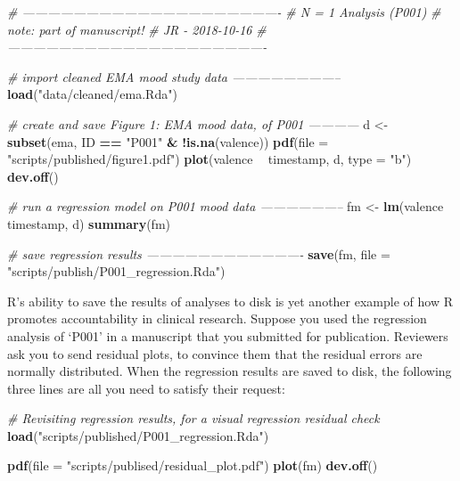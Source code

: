\documentclass[]{book}
\newenvironment{Shaded}{\begin{snugshade}}{\end{snugshade}}
\newcommand{\KeywordTok}[1]{\textcolor[rgb]{0.13,0.29,0.53}{\textbf{#1}}}
\newcommand{\DataTypeTok}[1]{\textcolor[rgb]{0.13,0.29,0.53}{#1}}
\newcommand{\StringTok}[1]{\textcolor[rgb]{0.31,0.60,0.02}{#1}}
\newcommand{\CommentTok}[1]{\textcolor[rgb]{0.56,0.35,0.01}{\textit{#1}}}
\newcommand{\OperatorTok}[1]{\textcolor[rgb]{0.81,0.36,0.00}{\textbf{#1}}}
\newcommand{\NormalTok}[1]{#1}
\begin{document}
\begin{Shaded}
\begin{Highlighting}[]
\CommentTok{# -------------------------------------------------------------}
\CommentTok{# N = 1 Analysis (P001)}
\CommentTok{# note: part of manuscript!}
\CommentTok{# JR - 2018-10-16}
\CommentTok{# -------------------------------------------------------------}

\CommentTok{# import cleaned EMA mood study data --------------------------}
\KeywordTok{load}\NormalTok{(}\StringTok{"data/cleaned/ema.Rda"}\NormalTok{)}

\CommentTok{# create and save Figure 1: EMA mood data, of P001 ------------ }
\NormalTok{d <-}\StringTok{ }\KeywordTok{subset}\NormalTok{(ema, ID }\OperatorTok{==}\StringTok{ "P001"} \OperatorTok{&}\StringTok{ }\OperatorTok{!}\KeywordTok{is.na}\NormalTok{(valence))}
\KeywordTok{pdf}\NormalTok{(}\DataTypeTok{file =} \StringTok{"scripts/published/figure1.pdf"}\NormalTok{)}
\KeywordTok{plot}\NormalTok{(valence }\OperatorTok{~}\StringTok{ }\NormalTok{timestamp, d, }\DataTypeTok{type =} \StringTok{"b"}\NormalTok{)}
\KeywordTok{dev.off}\NormalTok{()}

\CommentTok{# run a regression model on P001 mood data --------------------}
\NormalTok{fm <-}\StringTok{ }\KeywordTok{lm}\NormalTok{(valence }\OperatorTok{~}\StringTok{ }\NormalTok{timestamp, d)}
\KeywordTok{summary}\NormalTok{(fm)}

\CommentTok{# save regression results -------------------------------------}
\KeywordTok{save}\NormalTok{(fm, }\DataTypeTok{file =} \StringTok{"scripts/publish/P001_regression.Rda"}\NormalTok{)}
\end{Highlighting}
\end{Shaded}

R's ability to save the results of analyses to disk is yet another
example of how R promotes accountability in clinical research. Suppose
you used the regression analysis of `P001' in a manuscript that you
submitted for publication. Reviewers ask you to send residual plots, to
convince them that the residual errors are normally distributed. When
the regression results are saved to disk, the following three lines are
all you need to satisfy their request:

\begin{Shaded}
\begin{Highlighting}[]
\CommentTok{# Revisiting regression results, for a visual regression residual check  }
\KeywordTok{load}\NormalTok{(}\StringTok{"scripts/published/P001_regression.Rda"}\NormalTok{)}

\KeywordTok{pdf}\NormalTok{(}\DataTypeTok{file =} \StringTok{"scripts/publised/residual_plot.pdf"}\NormalTok{)}
\KeywordTok{plot}\NormalTok{(fm)}
\KeywordTok{dev.off}\NormalTok{()}
\end{Highlighting}
\end{Shaded}
\end{document}
